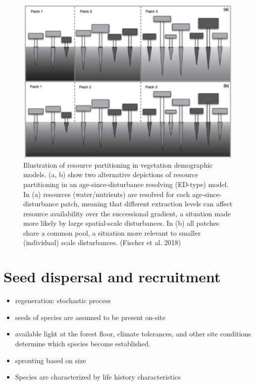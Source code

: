 \documentclass[
  12pt,
  oneside]{book}
\begin{document}
\begin{figure}

{\centering \includegraphics[width=0.8\linewidth]{figures/chap6/f631_root_competition} 

}

\caption{Illustration of resource partitioning in vegetation demographic models. (a, b) show two alternative depictions of resource partitioning in an age-since-disturbance resolving (ED-type) model. In (a) resources (water/nutrients) are resolved for each age-since-disturbance patch, meaning that different extraction levels can affect resource availability over the successional gradient, a situation made more likely by large spatial-scale disturbances. In (b) all patches share a common pool, a situation more relevant to smaller (individual) scale disturbances. (Fischer et al. 2018)}\label{fig:f631}
\end{figure}

\hypertarget{seed-dispersal-and-recruitment}{%
\section{Seed dispersal and recruitment}\label{seed-dispersal-and-recruitment}}

\begin{itemize}
\item
  regeneration: stochastic process
\item
  seeds of species are assumed to be present on-site
\item
  available light at the forest floor, climate tolerances, and other site conditions determine which species become established.
\item
  sprouting based on size
\item
  Species are characterized by life history characteristics
\end{itemize}
\end{document}
